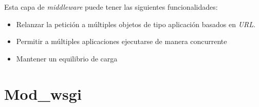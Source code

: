 Esta capa de \textit{middleware} puede tener las siguientes funcionalidades:
\begin{itemize}
	\item Relanzar la petición a múltiples objetos de tipo aplicación basados en \textit{URL}.
	\item Permitir a múltiples aplicaciones ejecutarse de manera concurrente
	\item Mantener un equilibrio de carga
\end{itemize}

\section{Mod\_wsgi}